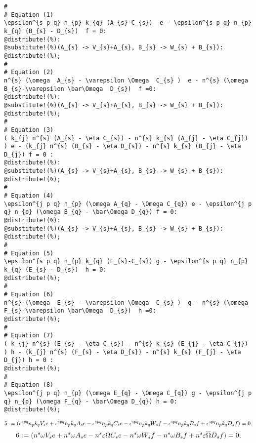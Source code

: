 \documentclass[11pt]{article}
\def\specialcolon{\mathrel{\mathop{:}}\hspace{-.5em}}
\renewcommand{\bar}[1]{\overline{#1}}
\begin{document}
{\color[named]{Blue}\begin{verbatim}
#
# Equation (1)
\epsilon^{s p q} n_{p} k_{q} (A_{s}-C_{s})  e - \epsilon^{s p q} n_{p} k_{q} (B_{s} - D_{s})  f = 0:
@distribute!(%):
@substitute!(%)(A_{s} -> V_{s}+A_{s}, B_{s} -> W_{s} + B_{s}):
@distribute!(%);
#
# Equation (2)
n^{s} (\omega  A_{s} - \varepsilon \Omega  C_{s} )  e - n^{s} (\omega   B_{s}-\varepsilon \bar\Omega  D_{s})  f =0:
@distribute!(%):
@substitute!(%)(A_{s} -> V_{s}+A_{s}, B_{s} -> W_{s} + B_{s}):
@distribute!(%);
#
# Equation (3)
( k_{j} n^{s} (A_{s} - \eta C_{s}) - n^{s} k_{s} (A_{j} - \eta C_{j}) ) e - (k_{j} n^{s} (B_{s} - \eta D_{s}) - n^{s} k_{s} (B_{j} - \eta D_{j}) f = 0 :
@distribute!(%):
@substitute!(%)(A_{s} -> V_{s}+A_{s}, B_{s} -> W_{s} + B_{s}):
@distribute!(%);
#
# Equation (4)
\epsilon^{j p q} n_{p} (\omega A_{q} - \Omega C_{q}) e - \epsilon^{j p q} n_{p} (\omega B_{q} - \bar\Omega D_{q}) f = 0:
@distribute!(%):
@substitute!(%)(A_{s} -> V_{s}+A_{s}, B_{s} -> W_{s} + B_{s}):
@distribute!(%);
#
# Equation (5)
\epsilon^{s p q} n_{p} k_{q} (E_{s}-C_{s}) g - \epsilon^{s p q} n_{p} k_{q} (E_{s} - D_{s})  h = 0:
@distribute!(%);
#
# Equation (6)
n^{s} (\omega  E_{s} - \varepsilon \Omega  C_{s} )  g - n^{s} (\omega   F_{s}-\varepsilon \bar\Omega  D_{s})  h =0:
@distribute!(%);
#
# Equation (7)
( k_{j} n^{s} (E_{s} - \eta C_{s}) - n^{s} k_{s} (E_{j} - \eta C_{j}) ) h - (k_{j} n^{s} (F_{s} - \eta D_{s}) - n^{s} k_{s} (F_{j} - \eta D_{j}) h = 0 :
@distribute!(%);
#
# Equation (8)
\epsilon^{j p q} n_{p} (\omega E_{q} - \Omega C_{q}) g - \epsilon^{j p q} n_{p} (\omega F_{q} - \bar\Omega D_{q}) h = 0:
@distribute!(%);
\end{verbatim}}
\begin{dmath*}[compact, spread=2pt]
5\specialcolon{}= ({\epsilon}^{s p q} {n}_{p} {k}_{q} {V}_{s} e + {\epsilon}^{s p q} {n}_{p} {k}_{q} {A}_{s} e - {\epsilon}^{s p q} {n}_{p} {k}_{q} {C}_{s} e - {\epsilon}^{s p q} {n}_{p} {k}_{q} {W}_{s} f - {\epsilon}^{s p q} {n}_{p} {k}_{q} {B}_{s} f + {\epsilon}^{s p q} {n}_{p} {k}_{q} {D}_{s} f) = 0;
\end{dmath*}
\begin{dmath*}[compact, spread=2pt]
6\specialcolon{}= ({n}^{s} \omega {V}_{s} e + {n}^{s} \omega {A}_{s} e - {n}^{s} \varepsilon \Omega {C}_{s} e - {n}^{s} \omega {W}_{s} f - {n}^{s} \omega {B}_{s} f + {n}^{s} \varepsilon \bar \Omega {D}_{s} f) = 0;
\end{dmath*}
\end{document}
